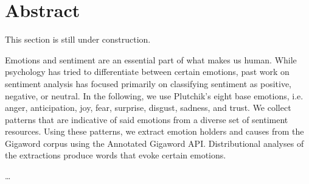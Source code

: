

\begingroup
\let\clearpage\relax
\let\cleardoublepage\relax
\let\cleardoublepage\relax

\chapter*{Abstract} %

This section is still under construction.

Emotions and sentiment are an essential part of what makes us human. While psychology has tried to differentiate between certain emotions, past work on sentiment analysis has focused primarily on classifying sentiment as positive, negative, or neutral. In the following, we use Plutchik's eight base emotions, i.e. anger, anticipation, joy, fear, surprise, disgust, sadness, and trust. We collect patterns that are indicative of said emotions from a diverse set of sentiment resources. Using these patterns, we extract emotion holders and causes from the Gigaword corpus using the Annotated Gigaword API. Distributional analyses of the extractions produce words that evoke certain emotions.

\dots

\endgroup			

\vfill